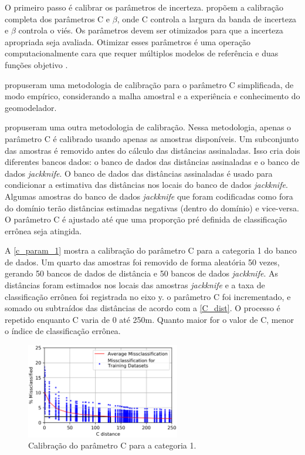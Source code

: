 O primeiro passo é calibrar os parâmetros de incerteza.  propõem a calibração completa dos parâmetros C e $\beta$, onde C controla a largura da banda de incerteza e $\beta$ controla o viés. Os parâmetros devem ser otimizados para que a incerteza apropriada seja avaliada. Otimizar esses parâmetros é uma operação computacionalmente cara que requer múltiplos modelos de referência e duas funções objetivo \cite{wilde2012kriging}.

 propuseram uma metodologia de calibração para o parâmetro C simplificada, de modo empírico, considerando a malha amostral e a experiência e conhecimento do geomodelador.

 propuseram uma outra metodologia de calibração. Nessa metodologia, apenas o parâmetro C é calibrado usando apenas as amostras disponíveis. Um subconjunto das amostras é removido antes do cálculo das distâncias assinaladas. Isso cria dois diferentes bancos dados: o banco de dados das distâncias assinaladas e o banco de dados \textit{jackknife}. O banco de dados das distâncias assinaladas é usado para condicionar a estimativa das distâncias nos locais do banco de dados \textit{jackknife}. Algumas amostras do banco de dados \textit{jackknife} que foram codificadas como fora do domínio terão distâncias estimadas negativas (dentro do domínio) e vice-versa. O parâmetro C é ajustado até que uma proporção pré definida de classificação errônea seja atingida.

A \autoref{c_param_1} mostra a calibração do parâmetro C para a categoria 1 do banco de dados. Um quarto das amostras foi removido de forma aleatória 50 vezes, gerando 50 bancos de dados de distância e 50 bancos de dados \textit{jackknife}. As distâncias foram estimados nos locais das amostras \textit{jackknife} e a taxa de classificação errônea foi registrada no eixo y. o parâmetro C foi incrementado, e somado ou subtraídos das distâncias de acordo com a \autoref{C_dist}. O processo é repetido enquanto C varia de 0 até 250m. Quanto maior for o valor de C, menor o índice de classificação errônea.

\begin{figure}[H]
	\caption{\label{c_param_1}Calibração do parâmetro C para a categoria 1.}
	\begin{center}
		\includegraphics[width=0.6\textwidth]{capitulo_2/uncert_1.png}
	\end{center}
\end{figure}

